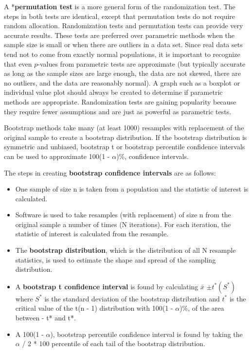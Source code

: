 \documentclass[
]{report}
\providecommand{\tightlist}{%
  \setlength{\itemsep}{0pt}\setlength{\parskip}{0pt}}
\begin{document}
A *\textbf{permutation test} is a more general form of the randomization test. The steps in both tests are identical, except that permutation tests do not require random allocation. Randomization tests and permutation tests can provide very accurate results. These tests are preferred over parametric methods when the sample size is small or when there are outliers in a data set. Since real data sets tend not to come from exactly normal populations, it is important to recognize that even \(p\)-values from parametric tests are approximate (but typically accurate as long as the sample sizes are large enough, the data are not skewed, there are no outliers, and the data are reasonably normal). A graph such as a boxplot or individual value plot should always be created to determine if parametric methods are appropriate. Randomization tests are gaining popularity because they require fewer assumptions and are just as powerful as parametric tests.

Bootstrap methods take many (at least 1000) resamples with replacement of the original sample to create a bootstrap distribution. If the bootstrap distribution is symmetric and unbiased, bootstrap t or bootstrap percentile confidence intervals can be used to approximate 100(1 - \(\alpha\))\%, confidence intervals.

The steps in creating \textbf{bootstrap confidence intervals} are as follows:

\begin{itemize}
\tightlist
\item
  One sample of size n is taken from a population and the statistic of interest is calculated.
\item
  Software is used to take resamples (with replacement) of size n from the original sample a number of
  times (N iterations). For each iteration, the statistic of interest is calculated from the resample.
\item
  The \textbf{bootstrap distribution}, which is the distribution of all N resample statistics, is used to estimate
  the shape and spread of the sampling distribution.
\item
  A \textbf{bootstrap t confidence interval} is found by calculating \(\bar{x}\) \(\pm t^*(S^*)\) where \(S^*\) is the standard
  deviation of the bootstrap distribution and \(t^*\) is the critical value of the t(n - 1) distribution with
  100(1 - \(\alpha\))\%, of the area between - t* and t*.
\item
  A 100(1 - \(\alpha\)), bootstrap percentile confidence interval is found by taking the \(\alpha\) / 2 * 100
  percentile of each tail of the bootstrap distribution.
\end{itemize}
\end{document}
